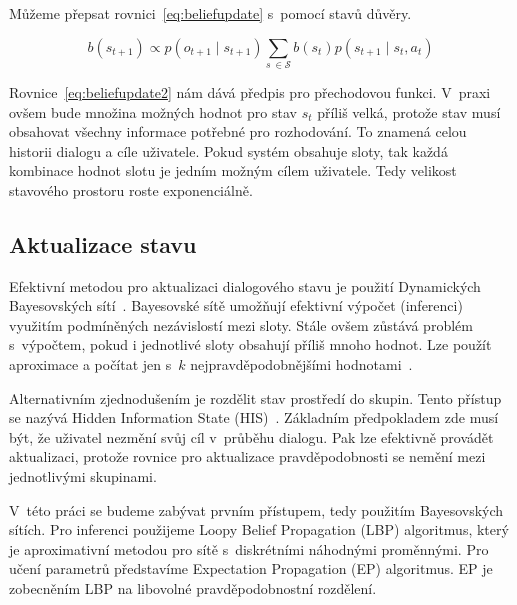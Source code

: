 Můžeme přepsat rovnici~\eqref{eq:beliefupdate} s~pomocí stavů důvěry.

\begin{equation}
b(s_{t+1}) \propto
    p(o_{t+1} \mid s_{t+1})
    \sum_{s~\in \mathcal{S}}
        b(s_t)
        p(s_{t+1} \mid s_t, a_t)
\label{eq:beliefupdate2}
\end{equation}

Rovnice~\eqref{eq:beliefupdate2} nám dává předpis pro přechodovou funkci.
V~praxi ovšem bude množina možných hodnot pro stav $s_t$ příliš velká, protože stav musí obsahovat všechny informace potřebné pro rozhodování.
To znamená celou historii dialogu a cíle uživatele. 
Pokud systém obsahuje sloty, tak každá kombinace hodnot slotu je jedním možným cílem uživatele. 
Tedy velikost stavového prostoru roste exponenciálně.

\subsection{Aktualizace stavu}

Efektivní metodou pro aktualizaci dialogového stavu je použití Dynamických Bayesovských sítí~\cite{thomson2008bayesian}.
Bayesovské sítě umožňují efektivní výpočet (inferenci) využitím podmíněných nezávislostí mezi sloty.
Stále ovšem zůstává problém s~výpočtem, pokud i jednotlivé sloty obsahují příliš mnoho hodnot.
Lze použít aproximace a počítat jen s~$k$ nejpravděpodobnějšími hodnotami~\cite{thomson2010bayesian}.

Alternativním zjednodušením je rozdělit stav prostředí do skupin. 
Tento přístup se nazývá Hidden Information State (HIS)~\cite{young2010hidden}.
Základním předpokladem zde musí být, že uživatel nezmění svůj cíl v~průběhu dialogu.
Pak lze efektivně provádět aktualizaci, protože rovnice pro aktualizace pravděpodobnosti se nemění mezi jednotlivými skupinami.

V~této práci se budeme zabývat prvním přístupem, tedy použitím Bayesovských sítích.
Pro inferenci použijeme Loopy Belief Propagation (LBP) algoritmus, který je aproximativní metodou pro sítě s~diskrétními náhodnými proměnnými.
Pro učení parametrů představíme Expectation Propagation (EP) algoritmus.
EP je zobecněním LBP na libovolné pravděpodobnostní rozdělení.
